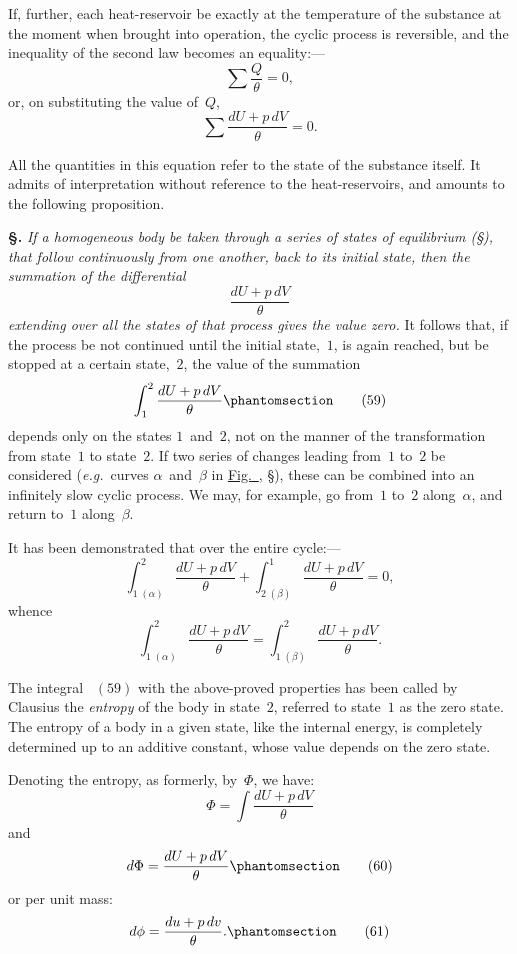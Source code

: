 \documentclass[12pt]{book}[2005/09/16]
\newcommand{\Chg}[2]{#2}
\newcommand{\Add}[1]{\Chg{}{#1}}
\newcommand{\Section}[1]{
  \medskip\par\textbf{§\;#1}
  \label{section:#1}
}
\newcommand{\SecRef}[2][§\;]{\hyperref[section:#2.]{{\upshape #1#2}}}
\newcommand{\Tag}[1]{%
  \phantomsection\label{eqn:#1}\tag*{\ensuremath{#1}}%
}
\newcommand{\Eq}[1]{%
  \hyperref[eqn:#1]{\ensuremath{#1}}%
}
\newcommand{\Fig}[1]{\hyperref[fig:#1]{Fig.~{\upshape #1}}}
\newcommand{\PageSep}[1]{\ignorespaces}
\newcommand{\eg}{\emph{e.g.}}
\newcommand{\tsum}{\mathop{\textstyle\sum}\limits}
\begin{document}
If, further, each heat-reservoir be exactly at the temperature
of the substance at the moment when brought into
operation, the cyclic process is reversible, and the inequality
of the second law becomes an equality\Add{:}---
\[
\tsum \frac{Q}{\theta} = 0,
\]
or, on substituting the value of~$Q$,
\[
\tsum \frac{dU + p\, dV}{\theta} = 0.
\]

All the quantities in this equation refer to the state of
the substance itself. It admits of interpretation without
reference to the heat-reservoirs, and amounts to the following
proposition.
\PageSep{97}

\Section{130.} \emph{If a homogeneous body be taken through a series of
states of equilibrium {\upshape(\SecRef{71})}, that follow continuously from one
another, back to its initial state, then the summation of the
differential
\[
\frac{dU + p\, dV}{\theta}
\]
extending over all the states of that process gives the value
zero.} It follows that, if the process be not continued until
the initial state,~$1$, is again reached, but be stopped at a
certain state,~$2$, the value of the summation
\[
\int_{1}^{2} \frac{dU + p\, dV}{\theta}
\Tag{(59)}
\]
depends only on the states $1$~and~$2$, not on the manner
of the transformation from state~$1$ to state~$2$. If two
series of changes leading from~$1$ to~$2$ be considered
(\eg\ curves $\alpha$~and~$\beta$ in \Fig{2}, \SecRef{75}), these can be combined
into an infinitely slow cyclic process. We may,
for example, go from~$1$ to~$2$ along~$\alpha$, and return to~$1$
along~$\beta$.

It has been demonstrated that over the entire cycle\Add{:}---
\[
\int_{1\; (\alpha)}^{2} \frac{dU + p\, dV}{\theta}
  + \int_{2\; (\beta)}^{1} \frac{dU + p\, dV}{\theta} = 0,
\]
whence
\[
\int_{1\; (\alpha)}^{2} \frac{dU + p\, dV}{\theta}
  = \int_{1\; (\beta)}^{2} \frac{dU + p\, dV}{\theta}.
\]

The integral~\Eq{(59)} with the above-proved properties has
been called by Clausius the \emph{entropy} of the body in state~$2$,
%
referred to state~$1$ as the zero state. The entropy of a
body in a given state, like the internal energy, is completely
determined up to an additive constant, whose value depends
on the zero state.
\PageSep{98}

Denoting the entropy, as formerly, by~$\Phi$, we have:
\[
\Phi = \int \frac{dU + p\, dV}{\theta}
\]
and
\[
d\Phi = \frac{dU + p\, dV}{\theta}
\Tag{(60)}
\]
or per unit mass:
\[
d\phi = \frac{du + p\, dv}{\theta}\Add{.}
\Tag{(61)}
\]
\end{document}
